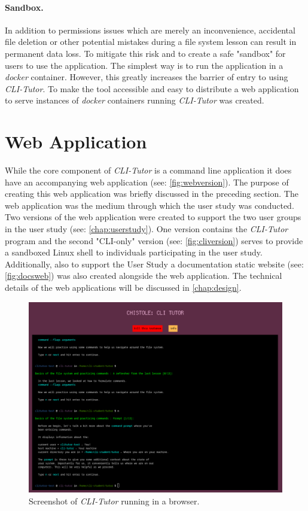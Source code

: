 \paragraph{Sandbox.} In addition to permissions issues which are merely an
inconvenience, accidental file deletion or other potential mistakes during a
file system lesson can result in permanent data loss. To mitigate this risk and
to create a safe "sandbox" for users to use the application. The simplest
way is to run the application in a \textit{docker}\cite{dockerinc_2022}
container. However, this greatly increases the barrier of entry to using
\textit{CLI-Tutor}. To make the tool accessible and easy to distribute
a web application to serve instances of \textit{docker} containers running
\textit{CLI-Tutor} was created.

\section{Web Application}

While the core component of \textit{CLI-Tutor} is a command line application it
does have an accompanying web application (see: \autoref{fig:webversion}). The
purpose of creating this web application was briefly discussed in the preceding
section. The web application was the medium through which the user study was
conducted. Two versions of the web application were created to support the two
user groups in the user study (see: \autoref{chap:userstudy}). One version
contains the \textit{CLI-Tutor} program and the second "CLI-only" version (see:
\autoref{fig:cliversion}) serves to provide a sandboxed Linux shell to
individuals participating in the user study. Additionally, also to support the
User Study a documentation static website (see: \autoref{fig:docsweb}) was also
created alongside the web application. The technical details of the web
applications will be discussed in \autoref{chap:design}.

\begin{figure}[htbp]
	\centering
	\includegraphics[width=1\textwidth]{img/cliwebshort}
	\caption{Screenshot of \textit{CLI-Tutor} running in a browser.}
	\label{fig:webversion}
\end{figure}

